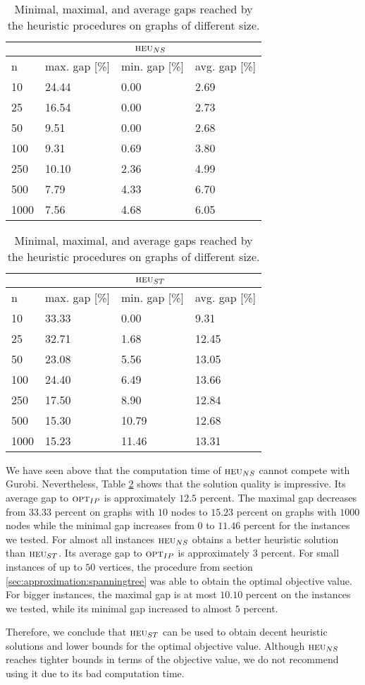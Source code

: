 \begin{table}[H]
	\centering
	\small
	\begin{tabular}{|l|l|l|l|}
		\hline
		&\multicolumn{3}{c|}{$\textsc{heu}_{NS}$}\\ \hline
		n&max. gap [\%]&min. gap [\%]&avg. gap [\%]\\ \hline
		10&24.44&0.00&2.69\\ \hline 
		25&16.54&0.00&2.73\\ \hline 
		50&9.51&0.00&2.68\\ \hline 
		100&9.31&0.69&3.80\\ \hline 
		250&10.10&2.36&4.99\\ \hline 
		500&7.79&4.33&6.70\\ \hline 
		1000&7.56&4.68&6.05\\ \hline 
	\end{tabular}\bigskip

	\begin{tabular}{|l|l|l|l|}
		\hline
		&\multicolumn{3}{c|}{$\textsc{heu}_{ST}$}\\ \hline
		n&max. gap [\%]&min. gap [\%]&avg. gap [\%]\\ \hline
		10&33.33&0.00&9.31\\ \hline 
		25&32.71&1.68&12.45\\ \hline 
		50&23.08&5.56&13.05\\ \hline 
		100&24.40&6.49&13.66\\ \hline 
		250&17.50&8.90&12.84\\ \hline 
		500&15.30&10.79&12.68\\ \hline 
		1000&15.23&11.46&13.31\\ \hline 
	\end{tabular}
	\caption{Minimal, maximal, and average gaps reached by the heuristic procedures on graphs of different size.}
	\label{table:heuristicquality}
\end{table}

We have seen above that the computation time of $\textsc{heu}_{NS}$ cannot compete with Gurobi. Nevertheless, Table \ref{table:heuristicquality} shows that the solution quality is impressive. Its average gap to $\textsc{opt}_{IP}$ is approximately $12.5$ percent. The maximal gap decreases from $33.33$ percent on graphs with $10$ nodes to $15.23$ percent on graphs with $1000$ nodes while the minimal gap increases from $0$ to $11.46$ percent for the instances we tested. For almost all instances $\textsc{heu}_{NS}$ obtains a better heuristic solution than $\textsc{heu}_{ST}$. Its average gap to $\textsc{opt}_{IP}$ is approximately $3$ percent. For small instances of up to $50$ vertices, the procedure from section \ref{sec:approximation:spanningtree} was able to obtain the optimal objective value. For bigger instances, the maximal gap is at most $10.10$ percent on the instances we tested, while its minimal gap increased to almost $5$ percent.\medskip

Therefore, we conclude that $\textsc{heu}_{ST}$ can be used to obtain decent heuristic solutions and lower bounds for the optimal objective value. Although $\textsc{heu}_{NS}$ reaches tighter bounds in terms of the objective value, we do not recommend using it due to its bad computation time.

